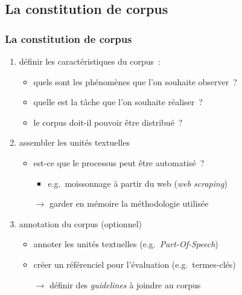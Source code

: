 \subsection{La constitution de corpus}


\begin{frame}
\frametitle{La constitution de corpus}

\begin{enumerate} \itemsep0.8em

    \item définir les caractéristiques du corpus~:
    \begin{itemize}
        \item quels sont les phénomènes que l'on souhaite observer~?
        \item quelle est la tâche que l'on souhaite réaliser~?
        \item le corpus doit-il pouvoir être distribué~?
    \end{itemize} 

    \item assembler les unités textuelles
    \begin{itemize}
        \item est-ce que le processus peut être automatisé~?
        \begin{itemize}
            \item e.g.~moissonnage à partir du web (\textit{web scraping})
        \end{itemize}
        \item[$\to$] garder en mémoire la méthodologie utilisée
    \end{itemize}

    \item annotation du corpus (optionnel)
    \begin{itemize}
        \item annoter les unités textuelles (e.g.~\textit{Part-Of-Speech})
        \item créer un référenciel pour l'évaluation (e.g.~termes-clés)
        \item[$\to$] définir des \textit{guidelines} à joindre au corpus
    \end{itemize}

\end{enumerate}

\end{frame}

